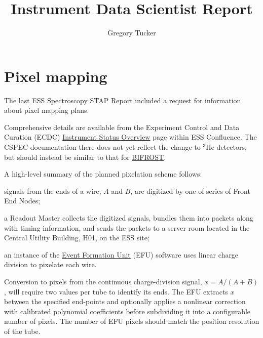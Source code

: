 \documentclass[a4paper, twocolumn, 10pt, revision]{ess}
\newcommand{\pdfsubject}{Spectroscopy Scientific and Technical Advisory Panel}
\newcommand{\pdftitle}{Instrument Data Scientist Report}
\newcommand{\pdfauthor}{Gregory Tucker}
\begin{document}
\renewcommand{\revisionlinethree}{\textrev{\pdftitle\revisiontail}}
\titlehead{\pdfsubject \hfill \revisionhead}
\title{\pdftitle}
\author{\pdfauthor}
\date{\revisiondate}
\maketitle


\section{Pixel mapping}
The last ESS Spectroscopy STAP Report \autocite{spectroscopy_stap_2022} included a request for information about pixel mapping plans.

Comprehensive details are available from the Experiment Control and Data Curation (ECDC)
\href{https://confluence.esss.lu.se/display/ECDC/Instrument+Status+Overview}{Instrument Status Overview} page within 
ESS Confluence.
The CSPEC documentation there does not yet reflect the change to $^3$He detectors,
but should instead be similar to that for \href{https://project.esss.dk/owncloud/index.php/s/4M60TNdqkMcppUX}{BIFROST}.

A high-level summary of the planned pixelation scheme follows:
\begin{inparaenum}
\item signals from the ends of a wire, $A$ and $B$, are digitized by one of series of Front End Nodes;
\item a Readout Master collects the digitized signals, bundles them into packets along with timing information, and sends the packets to a server room located in the Central Utility Building, H01, on the ESS site;
\item an instance of the \href{https://github.com/ess-dmsc/event-formation-unit}{Event Formation Unit} (EFU) software uses linear charge division to pixelate each wire.
\end{inparaenum}

Conversion to pixels from the continuous charge-division signal, $x = A/(A+B)$, will require two values per tube to identify its ends.
The EFU extracts $x$ between the specified end-points and optionally applies a nonlinear correction with calibrated polynomial coefficients
before subdividing it into a configurable number of pixels.
The number of EFU pixels should match the position resolution of the tube.
\end{document}
